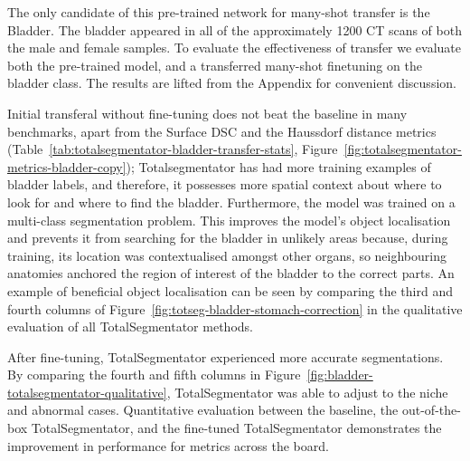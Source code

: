 \documentclass[11pt,twoside]{report}
\begin{document}

The only candidate of this pre-trained network for many-shot transfer is the Bladder. The bladder appeared in all of the approximately 1200 CT scans of both the male and female samples. To evaluate the effectiveness of transfer we evaluate both the pre-trained model, and a transferred many-shot finetuning on the bladder class. The results are lifted from the Appendix for convenient discussion.

Initial transferal without fine-tuning does not beat the baseline in many benchmarks, apart from the Surface DSC and the Haussdorf distance metrics (Table~\ref{tab:totalsegmentator-bladder-transfer-stats}, Figure~\ref{fig:totalsegmentator-metrics-bladder-copy}); Totalsegmentator has had more training examples of bladder labels, and therefore, it possesses more spatial context about where to look for and where to find the bladder. Furthermore, the model was trained on a multi-class segmentation problem. This improves the model's object localisation and prevents it from searching for the bladder in unlikely areas because, during training, its location was contextualised amongst other organs, so neighbouring anatomies anchored the region of interest of the bladder to the correct parts. An example of beneficial object localisation can be seen by comparing the third and fourth columns of Figure~\ref{fig:totseg-bladder-stomach-correction} in the qualitative evaluation of all TotalSegmentator methods.

After fine-tuning, TotalSegmentator experienced more accurate segmentations. By comparing the fourth and fifth columns in Figure~\ref{fig:bladder-totalsegmentator-qualitative}, TotalSegmentator was able to adjust to the niche and abnormal cases. Quantitative evaluation between the baseline, the out-of-the-box TotalSegmentator, and the fine-tuned TotalSegmentator demonstrates the improvement in performance for metrics across the board.
\end{document}
